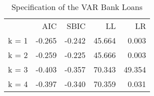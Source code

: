 \begin{table}[!h]
\caption{Specification of the VAR Bank Loans}
\centering
\begin{tabular}{lllll}
\cline{1-5}
\multicolumn{1}{c}{} &
  \multicolumn{1}{|r}{AIC} &
  \multicolumn{1}{r}{SBIC} &
  \multicolumn{1}{r}{LL} &
  \multicolumn{1}{r}{LR} \\
\cline{1-5}
\multicolumn{1}{l}{k = 1} &
  \multicolumn{1}{|r}{-0.265} &
  \multicolumn{1}{r}{-0.242} &
  \multicolumn{1}{r}{45.664} &
  \multicolumn{1}{r}{0.003} \\
\multicolumn{1}{l}{k = 2} &
  \multicolumn{1}{|r}{-0.259} &
  \multicolumn{1}{r}{-0.225} &
  \multicolumn{1}{r}{45.666} &
  \multicolumn{1}{r}{0.003} \\
\multicolumn{1}{l}{k = 3} &
  \multicolumn{1}{|r}{-0.403} &
  \multicolumn{1}{r}{-0.357} &
  \multicolumn{1}{r}{70.343} &
  \multicolumn{1}{r}{49.354} \\
\multicolumn{1}{l}{k = 4} &
  \multicolumn{1}{|r}{-0.397} &
  \multicolumn{1}{r}{-0.340} &
  \multicolumn{1}{r}{70.359} &
  \multicolumn{1}{r}{0.031} \\
\cline{1-5}
\end{tabular}
\end{table}
